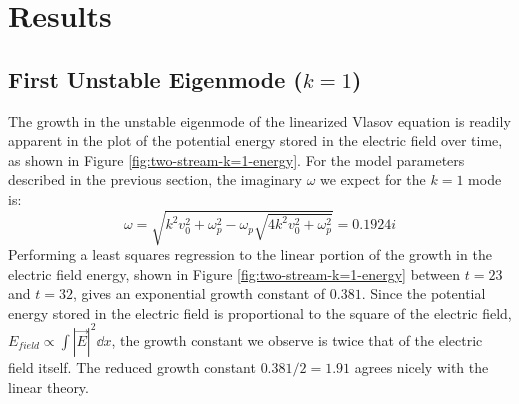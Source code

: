 \documentclass[%
 reprint,
 amsmath,amssymb,
 aps,
]{revtex4-2}
\begin{document}
\section{Results}

\subsection{First Unstable Eigenmode ($k=1$)}

The growth in the unstable eigenmode of the linearized Vlasov equation is readily apparent in the plot of the potential energy stored in the electric field over time, as shown in Figure \ref{fig:two-stream-k=1-energy}. For the model parameters described in the previous section, the imaginary $\omega$ we expect for the $k=1$ mode is:
\begin{equation}
\omega = \sqrt{k^2 v_0 ^2 + \omega_p ^2 - \omega_p \sqrt{4 k^2 v_0 ^2 + \omega_p ^2}} = 0.1924i
\end{equation}
Performing a least squares regression to the linear portion of the growth in the electric field energy, shown in Figure \ref{fig:two-stream-k=1-energy} between $t=23$ and $t=32$, gives an exponential growth constant of $0.381$. Since the potential energy stored in the electric field is proportional to the square of the electric field, $E_{field} \propto \int |\vec E|^2 \dd x$, the growth constant we observe is twice that of the electric field itself. The reduced growth constant $0.381/2 = 1.91$ agrees nicely with the linear theory.
\end{document}

